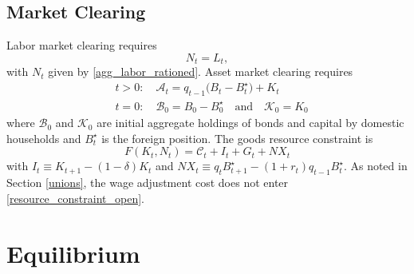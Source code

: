 \subsection{Market Clearing}

Labor market clearing requires
\begin{equation}\label{market_clear_labor_open}
    N_t = L_t ,
\end{equation}
with $N_t$ given by \eqref{agg_labor_rationed}. Asset market clearing requires
\begin{align}
    & t > 0: \quad \mathcal{A}_{t} =  q_{t-1} \big(B_{t} - B_t^\star \big) + K_{t} \label{market_clearing_assets_open}\\
    & t = 0: \quad \mathcal{B}_0 = B_0 - B_0^\star \quad \text{and} \quad \mathcal{K}_0 = K_0 \label{market_clearing_assets_t0_open}
\end{align}
where $\mathcal{B}_0$ and $\mathcal{K}_0$ are initial aggregate holdings of
bonds and capital by domestic households and $B^\star_t$ is the foreign
position. The goods resource constraint is
\begin{equation}\label{resource_constraint_open}
    F(K_t, N_t) = \mathcal{C}_t + I_t + G_t + NX_t
\end{equation}
with $I_t\equiv K_{t+1}-(1-\delta)K_t$ and
$NX_t\equiv q_tB^\star_{t+1}-(1+r_t)q_{t-1}B^\star_t$. As noted in Section
\ref{unions}, the wage adjustment cost does not enter
\eqref{resource_constraint_open}.

\section{Equilibrium} \label{equilibrium}

